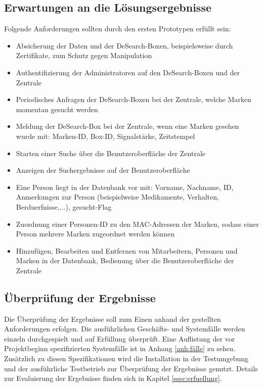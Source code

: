 \subsection{Erwartungen an die Lösungsergebnisse}
Folgende Anforderungen sollten durch den ersten Prototypen erfüllt sein:
\begin{itemize}
	\item  Absicherung der Daten und der DeSearch-Boxen, beispielsweise durch Zertifikate, zum Schutz gegen Manipulation
	\item Authentifizierung der Administratoren auf den DeSearch-Boxen und der Zentrale 
	\item Periodisches Anfragen der DeSearch-Boxen bei der Zentrale, welche Marken momentan gesucht werden
	\item Meldung der DeSearch-Box bei der Zentrale, wenn eine Marken gesehen wurde mit: Marken-ID, Box-ID, Signalstärke, Zeitstempel
	\item Starten einer Suche über die Benutzeroberfläche der Zentrale
	\item Anzeigen der Suchergebnisse auf der Benutzeroberfläche
	\item Eine Person liegt in der Datenbank vor mit: Vorname, Nachname, ID, Anmerkungen zur Person (beispielweise Medikamente, Verhalten, Berduerfnisse,...), gesucht-Flag
	\item Zuordnung einer Personen-ID zu den MAC-Adressen der Marken, sodass einer Person mehrere Marken zugeordnet werden können
	\item Hinzufügen, Bearbeiten und Entfernen von Mitarbeitern, Personen und Marken in der Datenbank, Bedienung über die Benutzeroberfläche der Zentrale
\end{itemize}

\subsection{Überprüfung der Ergebnisse}
Die Überprüfung der Ergebnisse soll zum Einen anhand der gestellten Anforderungen erfolgen. Die ausführlichen Geschäfts- und Systemfälle werden einzeln durchgespielt und auf Erfüllung überprüft. Eine Auflistung der vor Projektbeginn spezifizierten Systemfälle ist in Anhang \ref{anh:fälle} zu sehen. Zusätzlich zu diesen Spezifikationen wird die Installation in der Testumgebung und der ausführliche Testbetrieb zur Überprüfung der Ergebnisse genutzt. Details zur Evaluierung der Ergebnisse finden sich in Kapitel \ref{ssec:erfuellung}.









